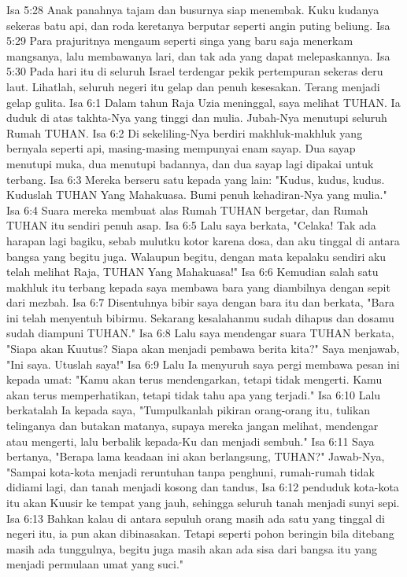 Isa 5:28  Anak panahnya tajam dan busurnya siap menembak. Kuku kudanya sekeras batu api, dan roda keretanya berputar seperti angin puting beliung.
Isa 5:29  Para prajuritnya mengaum seperti singa yang baru saja menerkam mangsanya, lalu membawanya lari, dan tak ada yang dapat melepaskannya.
Isa 5:30  Pada hari itu di seluruh Israel terdengar pekik pertempuran sekeras deru laut. Lihatlah, seluruh negeri itu gelap dan penuh kesesakan. Terang menjadi gelap gulita.
Isa 6:1  Dalam tahun Raja Uzia meninggal, saya melihat TUHAN. Ia duduk di atas takhta-Nya yang tinggi dan mulia. Jubah-Nya menutupi seluruh Rumah TUHAN.
Isa 6:2  Di sekeliling-Nya berdiri makhluk-makhluk yang bernyala seperti api, masing-masing mempunyai enam sayap. Dua sayap menutupi muka, dua menutupi badannya, dan dua sayap lagi dipakai untuk terbang.
Isa 6:3  Mereka berseru satu kepada yang lain: "Kudus, kudus, kudus. Kuduslah TUHAN Yang Mahakuasa. Bumi penuh kehadiran-Nya yang mulia."
Isa 6:4  Suara mereka membuat alas Rumah TUHAN bergetar, dan Rumah TUHAN itu sendiri penuh asap.
Isa 6:5  Lalu saya berkata, "Celaka! Tak ada harapan lagi bagiku, sebab mulutku kotor karena dosa, dan aku tinggal di antara bangsa yang begitu juga. Walaupun begitu, dengan mata kepalaku sendiri aku telah melihat Raja, TUHAN Yang Mahakuasa!"
Isa 6:6  Kemudian salah satu makhluk itu terbang kepada saya membawa bara yang diambilnya dengan sepit dari mezbah.
Isa 6:7  Disentuhnya bibir saya dengan bara itu dan berkata, "Bara ini telah menyentuh bibirmu. Sekarang kesalahanmu sudah dihapus dan dosamu sudah diampuni TUHAN."
Isa 6:8  Lalu saya mendengar suara TUHAN berkata, "Siapa akan Kuutus? Siapa akan menjadi pembawa berita kita?" Saya menjawab, "Ini saya. Utuslah saya!"
Isa 6:9  Lalu Ia menyuruh saya pergi membawa pesan ini kepada umat: "Kamu akan terus mendengarkan, tetapi tidak mengerti. Kamu akan terus memperhatikan, tetapi tidak tahu apa yang terjadi."
Isa 6:10  Lalu berkatalah Ia kepada saya, "Tumpulkanlah pikiran orang-orang itu, tulikan telinganya dan butakan matanya, supaya mereka jangan melihat, mendengar atau mengerti, lalu berbalik kepada-Ku dan menjadi sembuh."
Isa 6:11  Saya bertanya, "Berapa lama keadaan ini akan berlangsung, TUHAN?" Jawab-Nya, "Sampai kota-kota menjadi reruntuhan tanpa penghuni, rumah-rumah tidak didiami lagi, dan tanah menjadi kosong dan tandus,
Isa 6:12  penduduk kota-kota itu akan Kuusir ke tempat yang jauh, sehingga seluruh tanah menjadi sunyi sepi.
Isa 6:13  Bahkan kalau di antara sepuluh orang masih ada satu yang tinggal di negeri itu, ia pun akan dibinasakan. Tetapi seperti pohon beringin bila ditebang masih ada tunggulnya, begitu juga masih akan ada sisa dari bangsa itu yang menjadi permulaan umat yang suci."
